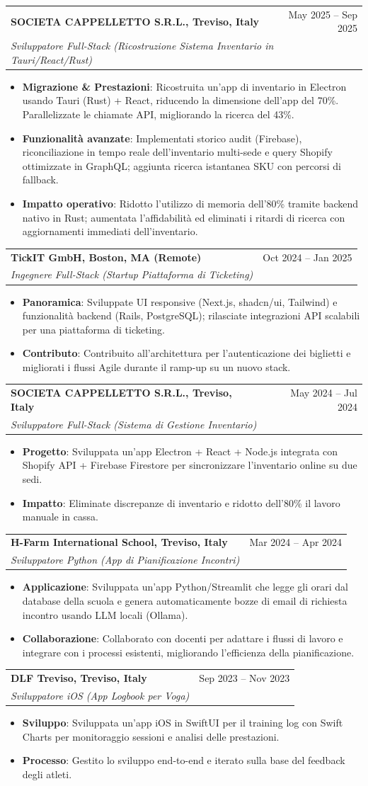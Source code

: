 \documentclass[letterpaper,11pt]{article}
\makeatletter
\newcommand{\resumeItem}[2]{
  \item\small{
    \textbf{#1}{: #2 \vspace{-2pt}}
  }
}
\newcommand{\resumeSubheading}[4]{
  \vspace{-1pt}\item
    \begin{tabular*}{0.97\textwidth}[t]{l@{\extracolsep{\fill}}r}
      \textbf{#1} & #2 \\
      \textit{\small#3} & \textit{\small #4} \\
    \end{tabular*}\vspace{-5pt}
}
\newcommand{\resumeItemListStart}{\begin{itemize}}
\newcommand{\resumeItemListEnd}{\end{itemize}\vspace{-5pt}}
\makeatother
\begin{document}
\resumeSubheading
{SOCIETA CAPPELLETTO S.R.L., Treviso, Italy}{May 2025 -- Sep 2025}
{Sviluppatore Full-Stack (Ricostruzione Sistema Inventario in Tauri/React/Rust)}{}
\resumeItemListStart
\resumeItem{Migrazione \& Prestazioni}
{Ricostruita un’app di inventario in Electron usando Tauri (Rust) + React, riducendo la dimensione dell’app del 70\%. Parallelizzate le chiamate API, migliorando la ricerca del 43\%.}
\resumeItem{Funzionalità avanzate}
{Implementati storico audit (Firebase), riconciliazione in tempo reale dell’inventario multi-sede e query Shopify ottimizzate in GraphQL; aggiunta ricerca istantanea SKU con percorsi di fallback.}
\resumeItem{Impatto operativo}
{Ridotto l’utilizzo di memoria dell’80\% tramite backend nativo in Rust; aumentata l’affidabilità ed eliminati i ritardi di ricerca con aggiornamenti immediati dell’inventario.}
\resumeItemListEnd

\resumeSubheading
{TickIT GmbH, Boston, MA (Remote)}{Oct 2024 -- Jan 2025}
{Ingegnere Full-Stack (Startup Piattaforma di Ticketing)}{}
\resumeItemListStart
\resumeItem{Panoramica}
{Sviluppate UI responsive (Next.js, shadcn/ui, Tailwind) e funzionalità backend (Rails, PostgreSQL); rilasciate integrazioni API scalabili per una piattaforma di ticketing.}
\resumeItem{Contributo}
{Contribuito all’architettura per l’autenticazione dei biglietti e migliorati i flussi Agile durante il ramp-up su un nuovo stack.}
\resumeItemListEnd

\resumeSubheading
{SOCIETA CAPPELLETTO S.R.L., Treviso, Italy}{May 2024 -- Jul 2024}
{Sviluppatore Full-Stack (Sistema di Gestione Inventario)}{}
\resumeItemListStart
\resumeItem{Progetto}
{Sviluppata un’app Electron + React + Node.js integrata con Shopify API + Firebase Firestore per sincronizzare l’inventario online su due sedi.}
\resumeItem{Impatto}
{Eliminate discrepanze di inventario e ridotto dell’80\% il lavoro manuale in cassa.}
\resumeItemListEnd

\resumeSubheading
{H-Farm International School, Treviso, Italy}{Mar 2024 -- Apr 2024}
{Sviluppatore Python (App di Pianificazione Incontri)}{}
\resumeItemListStart
\resumeItem{Applicazione}
{Sviluppata un’app Python/Streamlit che legge gli orari dal database della scuola e genera automaticamente bozze di email di richiesta incontro usando LLM locali (Ollama).}
\resumeItem{Collaborazione}
{Collaborato con docenti per adattare i flussi di lavoro e integrare con i processi esistenti, migliorando l’efficienza della pianificazione.}
\resumeItemListEnd

\resumeSubheading
{DLF Treviso, Treviso, Italy}{Sep 2023 -- Nov 2023}
{Sviluppatore iOS (App Logbook per Voga)}{}
\resumeItemListStart
\resumeItem{Sviluppo}
{Sviluppata un’app iOS in SwiftUI per il training log con Swift Charts per monitoraggio sessioni e analisi delle prestazioni.}
\resumeItem{Processo}
{Gestito lo sviluppo end-to-end e iterato sulla base del feedback degli atleti.}
\resumeItemListEnd
\end{document}
